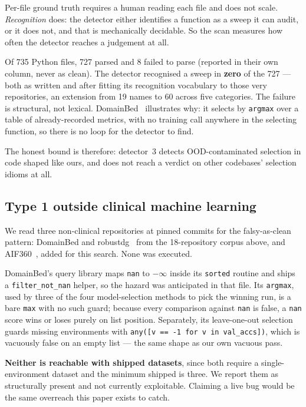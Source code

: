 \documentclass[pmlr,twocolumn,10pt]{jmlr}
\begin{document}
Per-file ground truth requires a human reading each file and does not scale.
\emph{Recognition} does: the detector either identifies a function as a sweep it
can audit, or it does not, and that is mechanically decidable. So the scan
measures how often the detector reaches a judgement at all.

Of 735 Python files, 727 parsed and 8 failed to parse (reported in their own
column, never as clean). The detector recognised a sweep in
\textbf{zero} of the 727 --- both as written and after fitting its recognition
vocabulary to those very repositories, an extension from 19 names to 60
across five categories. The failure is structural, not lexical.
DomainBed~\citep{gulrajani2021search} illustrates why: it selects by
\texttt{argmax} over a table of already-recorded metrics, with no training call
anywhere in the selecting function, so there is no loop for the detector to
find.

The honest bound is therefore: detector~3 detects OOD-contaminated selection in
code shaped like ours, and does not reach a verdict on other codebases'
selection idioms at all.

\subsection{Type 1 outside clinical machine learning}

We read three non-clinical repositories at pinned commits for the
falsy-as-clean pattern: DomainBed and robustdg~\citep{mahajan2021domain} from the
18-repository corpus above, and AIF360~\citep{bellamy2019aif360}, added for this
search. None was executed.

DomainBed's query library maps \texttt{nan} to $-\infty$ inside its
\texttt{sorted} routine and ships a \texttt{filter\_not\_nan} helper, so the
hazard was anticipated in that file. Its \texttt{argmax}, used by three of the
four model-selection methods to pick the winning run, is a bare \texttt{max}
with no such guard; because every comparison against \texttt{nan} is false, a
\texttt{nan} score wins or loses purely on list position. Separately, its
leave-one-out selection guards missing environments with
\texttt{any([v == -1 for v in val\_accs])}, which is vacuously false on an empty
list --- the same shape as our own vacuous pass.

\textbf{Neither is reachable with shipped datasets}, since both require a
single-environment dataset and the minimum shipped is three. We report them as
structurally present and not currently exploitable. Claiming a live bug would be
the same overreach this paper exists to catch.
\end{document}
